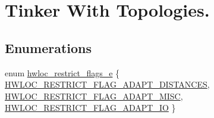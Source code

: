 \hypertarget{a00045}{
\section{Tinker With Topologies.}
\label{a00045}
}
\subsection*{Enumerations}
\begin{DoxyCompactItemize}
\item 
enum \hyperlink{a00045_ga9d80f08eb25b7ac22f1b998dc8bf521f}{hwloc\_\-restrict\_\-flags\_\-e} \{ \hyperlink{a00045_gga9d80f08eb25b7ac22f1b998dc8bf521fa4d18407f5520793b50b9e892f5bb55d1}{HWLOC\_\-RESTRICT\_\-FLAG\_\-ADAPT\_\-DISTANCES}, 
\hyperlink{a00045_gga9d80f08eb25b7ac22f1b998dc8bf521fa699969227a09bbc1a7de51dc9fb7be4b}{HWLOC\_\-RESTRICT\_\-FLAG\_\-ADAPT\_\-MISC}, 
\hyperlink{a00045_gga9d80f08eb25b7ac22f1b998dc8bf521faa95d6985e36ec1e55f68b210297a85cb}{HWLOC\_\-RESTRICT\_\-FLAG\_\-ADAPT\_\-IO}
 \}
\end{DoxyCompactItemize}
